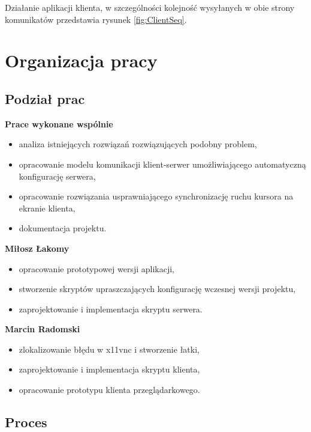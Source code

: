     Działanie aplikacji klienta, w szczególności kolejność wysyłanych w obie strony komunikatów przedstawia rysunek \ref{fig:ClientSeq}.
    \vfill


\section{Organizacja pracy}

  \subsection{Podział prac}

    \textbf{Prace wykonane wspólnie}
    \begin{itemize}[noitemsep]
      \item analiza istniejących rozwiązań rozwiązujących podobny problem,
      \item opracowanie modelu komunikacji klient-serwer umożliwiającego automatyczną konfigurację serwera,
      \item opracowanie rozwiązania usprawniającego synchronizację ruchu kursora na ekranie klienta,
      \item dokumentacja projektu.
    \end{itemize}

    \noindent
    \textbf{Miłosz Łakomy}
    \begin{itemize}[noitemsep]
      \item opracowanie prototypowej wersji aplikacji,
      \item stworzenie skryptów upraszczających konfigurację wczesnej wersji projektu,
      \item zaprojektowanie i implementacja skryptu serwera.
    \end{itemize}

    \noindent
    \textbf{Marcin Radomski}
    \begin{itemize}[noitemsep]
      \item zlokalizowanie błędu w x11vnc i stworzenie łatki,
      \item zaprojektowanie i implementacja skryptu klienta,
      \item opracowanie prototypu klienta przeglądarkowego.
    \end{itemize}

  \subsection{Proces}


